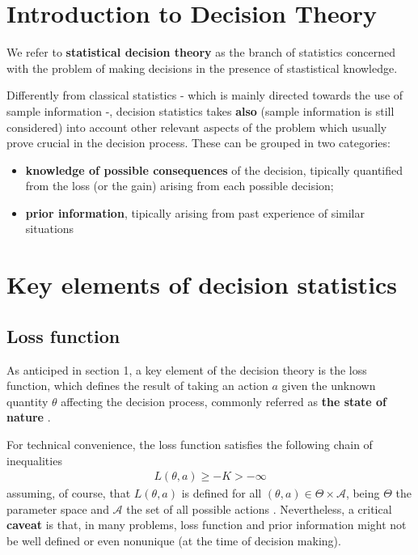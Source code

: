\documentclass{article}
\newcommand{\loss}{L(\theta, a)}
\begin{document}
	
	
	\section{Introduction to Decision Theory}
	We refer to \textbf{statistical decision theory} as the branch of statistics concerned with the problem of making decisions in the presence of stastistical knowledge.
	
	Differently from classical statistics - which is mainly directed towards the use of sample information -, decision statistics takes \textbf{also} (sample information is still considered) into account other relevant aspects of the problem which usually prove crucial in the decision process.
	These can be grouped in two categories:
	\begin{itemize}
		\item \textbf{knowledge of possible consequences} of the decision, tipically quantified from the loss (or the gain) arising from each possible decision;
		\item \textbf{prior information}, tipically arising from past experience of similar situations
	\end{itemize}
	
	\section{Key elements of decision statistics}
	\subsection{Loss function}
		As anticiped in section 1, a key element of the decision theory is the loss function, which defines the result of taking an action $a$ given the unknown quantity $\theta$ affecting the decision process, commonly 
	referred as \textbf{the state of nature} . 
	
	For technical convenience, the loss function satisfies the following chain of inequalities
	\begin{align*}
		\loss \ge -K > - \infty
	\end{align*} 
	assuming, of course, that $\loss$ is defined for all $(\theta, a) \in \Theta \times \mathcal{A}$, being $\Theta$ the parameter space and $\mathcal{A}$ the set of all possible actions . Nevertheless, a critical \textbf{caveat} is that, in many problems, loss function and prior information might not be well defined or even nonunique (at the time of decision making).
	 
\end{document}

